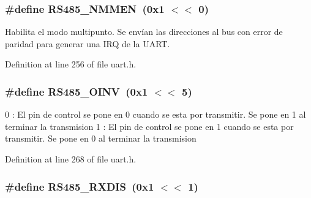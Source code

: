 \subsubsection[{\texorpdfstring{R\+S485\+\_\+\+N\+M\+M\+EN}{RS485_NMMEN}}]{\setlength{\rightskip}{0pt plus 5cm}\#define R\+S485\+\_\+\+N\+M\+M\+EN~(0x1 $<$$<$ 0)}\hypertarget{group___r_s485_m_o_d_e_ga124bdfe48f8f5794d2ce15f7de7120ff}{}\label{group___r_s485_m_o_d_e_ga124bdfe48f8f5794d2ce15f7de7120ff}


Habilita el modo multipunto. Se envían las direcciones al bus con error de paridad para generar una I\+RQ de la U\+A\+RT. 



Definition at line 256 of file uart.\+h.

\subsubsection[{\texorpdfstring{R\+S485\+\_\+\+O\+I\+NV}{RS485_OINV}}]{\setlength{\rightskip}{0pt plus 5cm}\#define R\+S485\+\_\+\+O\+I\+NV~(0x1 $<$$<$ 5)}\hypertarget{group___r_s485_m_o_d_e_ga4067a15fda5fce2f25e4e722067d41d7}{}\label{group___r_s485_m_o_d_e_ga4067a15fda5fce2f25e4e722067d41d7}


0 \+: El pin de control se pone en 0 cuando se esta por transmitir. Se pone en 1 al terminar la transmision 1 \+: El pin de control se pone en 1 cuando se esta por transmitir. Se pone en 0 al terminar la transmision 



Definition at line 268 of file uart.\+h.

\subsubsection[{\texorpdfstring{R\+S485\+\_\+\+R\+X\+D\+IS}{RS485_RXDIS}}]{\setlength{\rightskip}{0pt plus 5cm}\#define R\+S485\+\_\+\+R\+X\+D\+IS~(0x1 $<$$<$ 1)}\hypertarget{group___r_s485_m_o_d_e_ga6dd71ac874eee782a027c667162d2401}{}\label{group___r_s485_m_o_d_e_ga6dd71ac874eee782a027c667162d2401}


